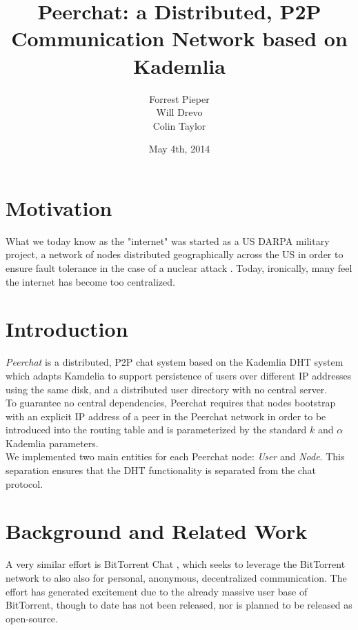 \documentclass{article}
\title{Peerchat: a Distributed, P2P Communication Network based on Kademlia}
\author{
  Forrest Pieper\\
  Will Drevo\\
  Colin Taylor
}
\date{May 4th, 2014}
\begin{document}
\maketitle

\section{Motivation}
\label{Motivation}

What we today know as the "internet" was started as a US DARPA military project, a network of nodes distributed geographically across the US in order to ensure fault tolerance in the case of a nuclear attack \cite{?}. Today, ironically, many feel the internet has become too centralized. \\

\section{Introduction}

\textit{Peerchat} is a distributed, P2P chat system based on the Kademlia DHT \cite{Maymounkov02} system which adapts Kamdelia to support persistence of users over different IP addresses using the same disk, and a distributed user directory with no central server. \\

To guarantee no central dependencies, Peerchat requires that nodes bootstrap with an explicit IP address of a peer in the Peerchat network in order to be introduced into the routing table and is parameterized by the standard $k$ and $\alpha$ Kademlia parameters. \\

We implemented two main entities for each Peerchat node: \textit{User} and \textit{Node}. This separation ensures that the DHT functionality is separated from the chat protocol. 

\section{Background and Related Work}

A very similar effort is BitTorrent Chat \cite{?}, which seeks to leverage the BitTorrent network to also also for personal, anonymous, decentralized communication. The effort has generated excitement due to the already massive user base of BitTorrent, though to date has not been released, nor is planned to be released as open-source. \\
\end{document}
